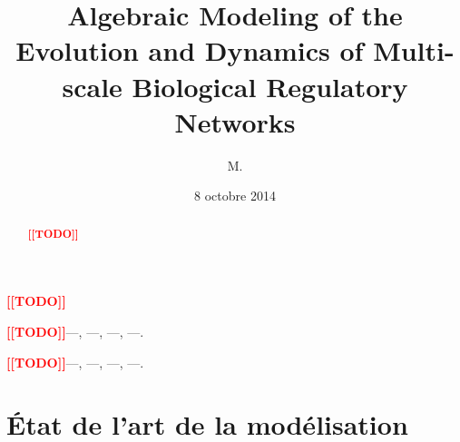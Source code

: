 \documentclass[12pt, french]{these-LUNAM}  %
\title{Algebraic Modeling of the Evolution and Dynamics of Multi-scale
  Biological Regulatory Networks}
\subtitle{\TODO}
\author{M.}{Maxime}{Folschette}
\date{8 octobre 2014}
\theoremstyle{definition}
\theoremstyle{remark}
\newcommand{\todo}[1]{\textcolor{red}{\textbf{[[#1]]}}}
\newcommand{\TODO}{\todo{TODO}}
\begin{document}
\begin{resume}
  \TODO
\end{resume}

\begin{motscles}
   \TODO ---, ---, ---, ---.
\end{motscles}

\begin{abstract}
  \TODO
   \lipsum[1-1]
\end{abstract}

\begin{keywords}
   \TODO ---, ---, ---, ---.
\end{keywords}

\maketitle

\setcounter{tocdepth}{2}
\setcounter{secnumdepth}{3}
\tableofcontents







\chapter{État de l'art de la modélisation}
\end{document}
